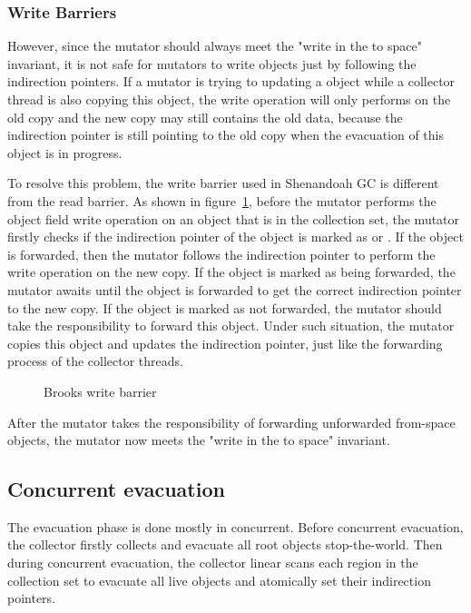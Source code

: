 \subsubsection{Write Barriers}

However, since the mutator should always meet the "write in the to space" invariant,
it is not safe for mutators to write objects just by following the indirection pointers.
If a mutator is trying to updating a object while a collector thread is also copying
this object, the write operation will only performs on the old copy and the new copy may still contains the
old data, because the indirection pointer is still pointing to the old copy when
the evacuation of this object is in progress.

To resolve this problem, the write barrier used in Shenandoah GC is different from the
read barrier. As shown in figure~\ref{fig:brookswritebarrier}, before the mutator
performs the object field write operation on an object that is in the collection set,
the mutator firstly checks if the indirection pointer of the object is marked as 
or . If the object is forwarded, then the mutator follows
the indirection pointer to perform the write operation on the new copy.
If the object is marked as being forwarded, the mutator awaits until the object is forwarded to
get the correct indirection pointer to the new copy.
If the object is marked as not forwarded, the mutator should take the responsibility to forward this object.
Under such situation, the mutator copies this object and updates the indirection pointer,
just like the forwarding process of the collector threads.

\begin{figure}
  \centering
  
  \caption{Brooks write barrier}
  \label{fig:brookswritebarrier}
\end{figure}

After the mutator takes the responsibility of forwarding unforwarded from-space objects,
the mutator now meets the "write in the to space" invariant. 

\subsection{Concurrent evacuation}

The evacuation phase is done mostly in concurrent. Before concurrent evacuation,
the collector firstly collects and evacuate all root objects stop-the-world.
Then during concurrent evacuation, the collector linear scans each region in the
collection set to evacuate all live objects and atomically set their indirection
pointers.

